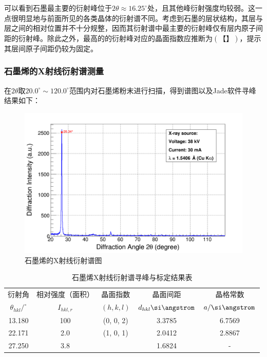 \documentclass{thuemp}
\begin{document}
可以看到石墨最主要的衍射峰位于$2\theta \approx 16.25^\circ$处，且其他峰衍射强度均较弱。这一点很明显地与前面所见的各类晶体的衍射谱不同。考虑到石墨的层状结构，其层与层之间的相对位置并不十分规整，因而其衍射谱中最主要的衍射峰仅有层内原子间距的衍射峰。除此之外，最高的的衍射峰对应的晶面指数应推断为$(【】)$，提示其层间原子间距仍较为固定。

\subsubsection{石墨烯的X射线衍射谱测量}

在$2\theta$取$20.0^\circ \sim 120.0^\circ$范围内对石墨烯粉末进行扫描，得到谱图以及Jade软件寻峰结果如下： 

\begin{figure}[H]
    \centering
    \includegraphics[width=0.8\linewidth]{../Data/C-Graphene-multi.png}
    \caption{石墨烯的X射线衍射谱图}
    \label{fig:graphene_xrd}
\end{figure}

\begin{table}
    \centering
    \captionnamefont{\wuhao\bf\heiti}
    \captiontitlefont{\wuhao\bf\heiti}
    \caption{石墨烯X射线衍射谱寻峰与标定结果表}
    \label{tab:graphene_xrd}
    \liuhao
    \begin{tabular}{ccccc}
        \toprule
        衍射角 & 相对强度（面积）& 晶面指数 & 晶面间距 & 晶格常数 \\
        $\theta_{hkl}/^\circ$ & $I_{hkl,r}$ & $(h,k,l)$ & $d_{hkl}\text{\si\angstrom}$ & $a/\text{\si\angstrom}$\\
        \midrule
        13.180 & 100& (0, 0, 2)& 3.3785 & 6.7569 \\
        22.171 & 2.0& (1, 0, 1)& 2.0412 & 2.8867 \\
        27.250 & 3.8&          & 1.6824 &    -   \\
        \bottomrule
    \end{tabular}
\end{table}
\end{document}
